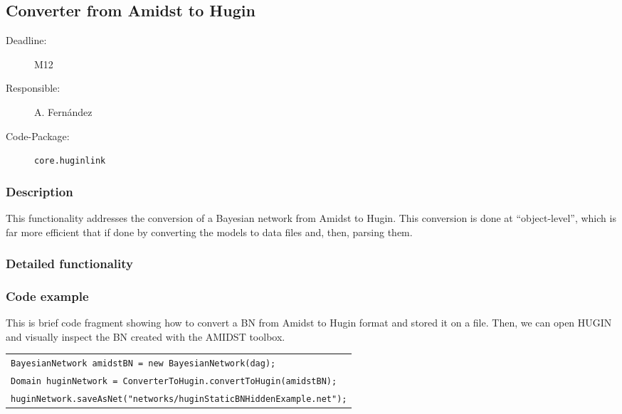 \newpage
\subsection{Converter from Amidst to Hugin}
\label{ConverterFromAmidstToHugin}

\begin{description}
\item[Deadline:] M12
\item[Responsible:] A. Fern\'andez
\item[Code-Package:] \texttt{core.huginlink}
\end{description}
\subsubsection*{Description}

This functionality addresses the conversion of a Bayesian network from Amidst to Hugin. This conversion is done at ``object-level'', which is far more efficient that if done by converting the models to data files and, then, parsing them. 

\subsubsection*{Detailed functionality}

\vspace{1in}

\subsubsection*{Code example}

This is brief code fragment showing how to convert a BN from Amidst to Hugin format and stored it on a file. Then, we can open HUGIN and visually inspect the BN created with the AMIDST toolbox. 

\begin{table}[H]
\begin{tabular}{l} \hline
\texttt{BayesianNetwork amidstBN = new BayesianNetwork(dag);}\\
\texttt{Domain huginNetwork = ConverterToHugin.convertToHugin(amidstBN);}\\
\texttt{huginNetwork.saveAsNet("networks/huginStaticBNHiddenExample.net");}\\ \hline

\end{tabular}
\end{table} 